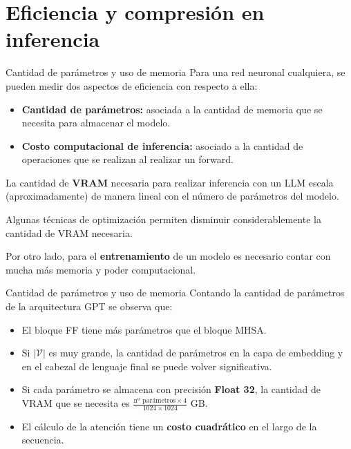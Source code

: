 \documentclass{beamer}
\begin{document}
\section{Eficiencia y compresión en inferencia}

\begin{frame}{Cantidad de parámetros y uso de memoria}
    Para una red neuronal cualquiera, se pueden medir dos aspectos de eficiencia con respecto a ella:
    \begin{itemize}
        \item \textbf{Cantidad de parámetros:} asociada a la cantidad de memoria que se necesita para almacenar el modelo.
        \item \textbf{Costo computacional de inferencia:} asociado a la cantidad de operaciones que se realizan al realizar un forward.
    \end{itemize}
    La cantidad de \textbf{VRAM} necesaria para realizar inferencia con un LLM escala (aproximadamente) de manera lineal con el número de parámetros del modelo.

    Algunas técnicas de optimización permiten disminuir considerablemente la cantidad de VRAM necesaria.

    Por otro lado, para el \textbf{entrenamiento} de un modelo es necesario contar con mucha más memoria y poder computacional.
\end{frame}

\begin{frame}{Cantidad de parámetros y uso de memoria}
    Contando la cantidad de parámetros de la arquitectura GPT se observa que:
    \begin{itemize}
        \item El bloque FF tiene más parámetros que el bloque MHSA.
        \item Si $|\mathcal{V}|$ es muy grande, la cantidad de parámetros en la capa de embedding y en el cabezal de lenguaje final se puede volver significativa.
        \item Si cada parámetro se almacena con precisión \textbf{Float 32}, la cantidad de VRAM que se necesita es $\frac{\text{nº parámetros}\times 4}{1024\times1024}$ GB.
        \item El cálculo de la atención tiene un \textbf{costo cuadrático} en el largo de la secuencia.
    \end{itemize}
\end{frame}
\end{document}
